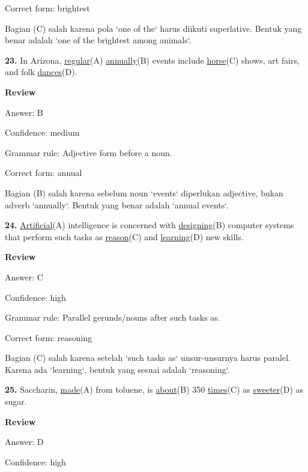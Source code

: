 \documentclass[12pt]{article}
\begin{document}
Correct form: brightest\par
Bagian (C) salah karena pola `one of the` harus diikuti superlative. Bentuk yang benar adalah `one of the brightest among animals`.\par
\endgroup
\par
\vspace{\questionblockgap}
\noindent\textbf{23.} In Arizona, \uline{regular}(A) \uline{annually}(B) events include \uline{horse}(C) shows, art fairs, and folk \uline{dances}(D).
\par
\begingroup
\setlength{\parskip}{0pt}
\setlength{\parindent}{0pt}
\textbf{Review}\par
Answer: B\par
Confidence: medium\par
Grammar rule: Adjective form before a noun.\par
Correct form: annual\par
Bagian (B) salah karena sebelum noun `events` diperlukan adjective, bukan adverb `annually`. Bentuk yang benar adalah `annual events`.\par
\endgroup
\par
\vspace{\questionblockgap}
\noindent\textbf{24.} \uline{Artificial}(A) intelligence is concerned with \uline{designing}(B) computer systems that perform such tasks as \uline{reason}(C) and \uline{learning}(D) new skills.
\par
\begingroup
\setlength{\parskip}{0pt}
\setlength{\parindent}{0pt}
\textbf{Review}\par
Answer: C\par
Confidence: high\par
Grammar rule: Parallel gerunds/nouns after such tasks as.\par
Correct form: reasoning\par
Bagian (C) salah karena setelah `such tasks as` unsur-unsurnya harus paralel. Karena ada `learning`, bentuk yang sesuai adalah `reasoning`.\par
\endgroup
\par
\vspace{\questionblockgap}
\noindent\textbf{25.} Saccharin, \uline{made}(A) from toluene, is \uline{about}(B) 350 \uline{times}(C) as \uline{sweeter}(D) as sugar.
\par
\begingroup
\setlength{\parskip}{0pt}
\setlength{\parindent}{0pt}
\textbf{Review}\par
Answer: D\par
Confidence: high\par
\end{document}

